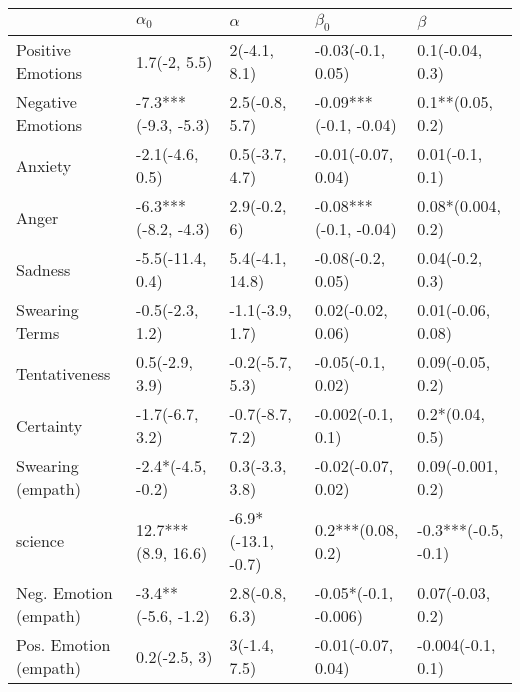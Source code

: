 \begin{tabular}{lllll}
\toprule
{} &           $\alpha_0$ &            $\alpha$ &              $\beta_0$ &              $\beta$ \\
\midrule
Positive Emotions     &         1.7(-2, 5.5) &        2(-4.1, 8.1) &      -0.03(-0.1, 0.05) &      0.1(-0.04, 0.3) \\
Negative Emotions     &  -7.3***(-9.3, -5.3) &      2.5(-0.8, 5.7) &  -0.09***(-0.1, -0.04) &     0.1**(0.05, 0.2) \\
Anxiety               &      -2.1(-4.6, 0.5) &      0.5(-3.7, 4.7) &     -0.01(-0.07, 0.04) &      0.01(-0.1, 0.1) \\
Anger                 &  -6.3***(-8.2, -4.3) &        2.9(-0.2, 6) &  -0.08***(-0.1, -0.04) &    0.08*(0.004, 0.2) \\
Sadness               &     -5.5(-11.4, 0.4) &     5.4(-4.1, 14.8) &      -0.08(-0.2, 0.05) &      0.04(-0.2, 0.3) \\
Swearing Terms        &      -0.5(-2.3, 1.2) &     -1.1(-3.9, 1.7) &      0.02(-0.02, 0.06) &    0.01(-0.06, 0.08) \\
Tentativeness         &       0.5(-2.9, 3.9) &     -0.2(-5.7, 5.3) &      -0.05(-0.1, 0.02) &     0.09(-0.05, 0.2) \\
Certainty             &      -1.7(-6.7, 3.2) &     -0.7(-8.7, 7.2) &      -0.002(-0.1, 0.1) &      0.2*(0.04, 0.5) \\
Swearing (empath)     &    -2.4*(-4.5, -0.2) &      0.3(-3.3, 3.8) &     -0.02(-0.07, 0.02) &    0.09(-0.001, 0.2) \\
science               &   12.7***(8.9, 16.6) &  -6.9*(-13.1, -0.7) &      0.2***(0.08, 0.2) &  -0.3***(-0.5, -0.1) \\
Neg. Emotion (empath) &   -3.4**(-5.6, -1.2) &      2.8(-0.8, 6.3) &   -0.05*(-0.1, -0.006) &     0.07(-0.03, 0.2) \\
Pos. Emotion (empath) &         0.2(-2.5, 3) &        3(-1.4, 7.5) &     -0.01(-0.07, 0.04) &    -0.004(-0.1, 0.1) \\
\bottomrule
\end{tabular}
